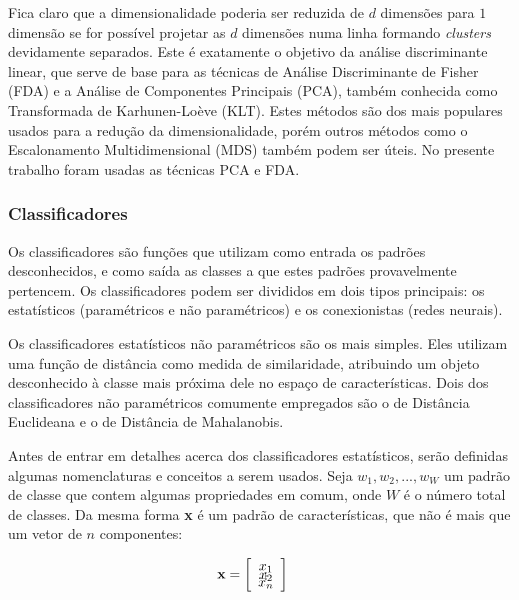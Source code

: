 Fica claro que a dimensionalidade poderia ser reduzida de $d$
dimensões para $1$ dimensão se for possível projetar as $d$ dimensões
numa linha formando \textit{clusters} devidamente separados. Este é
exatamente o objetivo da análise discriminante linear, que serve de
base para as técnicas de Análise Discriminante de Fisher (FDA) e a
Análise de Componentes Principais (PCA), também conhecida como
Transformada de Karhunen-Loève (KLT). Estes métodos são dos mais
populares usados para a redução da dimensionalidade, porém outros
métodos como o Escalonamento Multidimensional (MDS) também podem ser
úteis.\cite{117,122} No presente trabalho foram usadas as técnicas PCA
e FDA.

\vspace{20 mm}

\subsubsection{Classificadores}

Os classificadores são funções que utilizam como entrada os padrões
desconhecidos, e como saída as classes a que estes padrões
provavelmente pertencem. Os classificadores podem ser divididos em
dois tipos principais: os estatísticos (paramétricos e não
paramétricos) e os conexionistas (redes neurais).\cite{52}

Os classificadores estatísticos não paramétricos são os mais
simples. Eles utilizam uma função de distância como medida de
similaridade, atribuindo um objeto desconhecido à classe mais próxima
dele no espaço de características. Dois dos classificadores não
paramétricos comumente empregados são o de Distância Euclideana e o de
Distância de Mahalanobis.

Antes de entrar em detalhes acerca dos classificadores estatísticos,
serão definidas algumas nomenclaturas e conceitos a serem usados. Seja
$w_1,w_2,...,w_W$ um padrão de classe que contem algumas propriedades
em comum, onde $W$ é o número total de classes. Da mesma forma
\textbf{x} é um padrão de características, que não é mais que um vetor
de $n$ componentes:

\begin{align}\label{eq-meadclass}
 &\textbf{x}=
  \left[ 
   \begin{array}{c c c c c c}
    x_1\\[-2mm]
    x_2\\[-4mm]
    .\\[-5mm]
    .\\[-5mm]
    .\\[-1mm]
    x_n
   \end{array}  
  \right]
\end{align}

